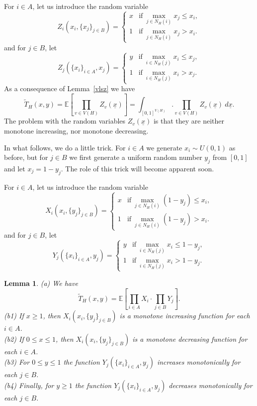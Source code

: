 \documentclass[12pt,a4paper]{amsart}
\numberwithin{equation}{section}
\theoremstyle{plain}
\newtheorem{Lemma}[Th]{Lemma}
\theoremstyle{definition}
\newcommand{\1}{\textbf{1}}
\newcommand{\E}{\mathbb{E}}
\newcommand{\wT}{\widetilde{T}}
\begin{document}
For $i\in A$, let us introduce the random variable
$$Z_{i}(x_i,\{x_j\}_{j\in B})=\left\{ \begin{array}{ll}
x & \mbox{if}\ \max_{j\in N_H(i)}x_j\leqslant   x_i,\\
1 & \mbox{if}\ \max_{j\in N_H(i)}x_j> x_i.
\end{array} \right.$$
and for $j\in B$, let
$$Z_{j}(\{x_i\}_{i \in A},x_j)=\left\{ \begin{array}{ll}
y & \mbox{if}\ \max_{i\in N_H(j)}x_i\leqslant   x_j,\\
1 & \mbox{if}\ \max_{i\in N_H(j)}x_i>x_j.
\end{array} \right.$$
As a consequence of Lemma~\ref{vlsz} we have
\begin{equation} \label{eq-vlsz}
\wT_H(x,y)=\mathbb{E}\left[\prod_{v\in V(H)}Z_v(\underline{x})\right]=\int_{[0,1]^{V(H)}}.\prod_{v\in V(H)}Z_v(\underline{x})\ d\underline{x}.
\end{equation}
The problem with the random variables $Z_v(\underline{x})$ is that they are neither monotone increasing, nor monotone decreasing.

In what follows, we do a little trick. For $i\in A$ we generate $x_i\sim U(0,1)$ as before, but for $j\in B$  we first generate a uniform random number $y_j$ from $[0,1]$ and let $x_j=1-y_j$. 
The role of this trick will become apparent soon.
 
For $i\in A$, let us introduce the random variable
$$X_{i}(x_i,\{y_j\}_{j\in B})=\left\{ \begin{array}{ll}
x & \mbox{if}\ \max_{j\in N_H(i)}(1-y_j)\leqslant   x_i,\\
1 & \mbox{if}\ \max_{j\in N_H(i)}(1-y_j)> x_i.
\end{array} \right.$$
and for $j\in B$, let
$$Y_{j}(\{x_i\}_{i \in A},y_j)=\left\{ \begin{array}{ll}
y & \mbox{if}\ \max_{i\in N_H(j)}x_i\leqslant   1-y_j,\\
1 & \mbox{if}\ \max_{i\in N_H(j)}x_i>1-y_j.
\end{array} \right.$$

\begin{Lemma}
(a) We have 
$$\widetilde{T}_H(x,y)=\E\left[ \prod_{i\in A}X_i\cdot \prod_{j\in B}Y_j\right].$$
(b1) If $x\geqslant1$, then $X_{i}(x_i,\{y_j\}_{j\in B})$ is a monotone increasing function for each $i\in A$. \\
(b2) If $0\leqslant   x\leqslant   1$, then $X_{i}(x_i,\{y_j\}_{j\in B})$ is a monotone decreasing function for each $i\in A$. \\
(b3) For $0\leqslant   y\leqslant   1$ the function $Y_{j}(\{x_i\}_{i \in A},y_j)$ increases monotonically for each $j\in B$.\\ 
(b4) Finally, for $y\geqslant1$ the function $Y_{j}(\{x_i\}_{i \in A},y_j)$ decreases monotonically for each $j\in B$.
\end{Lemma}
\end{document}
